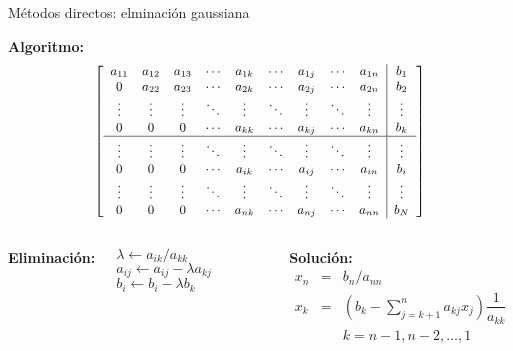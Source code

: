 \documentclass[9pt, aspectratio=169]{beamer}
\begin{document}
\begin{frame}{Métodos directos: elminación gaussiana}

\textbf{Algoritmo:}
\begin{equation*} {\small
\left[ 
 \begin{array}{ccccccccc|c}
 a_{11} & a_{12} & a_{13} & \cdots & a_{1k} & \cdots & a_{1j} & \cdots & a_{1n} & b_1 \\
 0      & a_{22} & a_{23} & \cdots & a_{2k} & \cdots & a_{2j} & \cdots & a_{2n} & b_2 \\
 \vdots & \vdots & \vdots & \ddots & \vdots & \ddots & \vdots & \ddots & \vdots & \vdots \\
 0      & 0      & 0      & \cdots & a_{kk} & \cdots & a_{kj} & \cdots & a_{kn} & b_k \\
 \hline
\vdots & \vdots & \vdots & \ddots & \vdots & \ddots & \vdots & \ddots & \vdots & \vdots \\
 0      & 0      & 0      & \cdots & a_{ik} & \cdots & a_{ij} & \cdots & a_{in} & b_i \\
\vdots & \vdots & \vdots & \ddots & \vdots & \ddots & \vdots & \ddots & \vdots & \vdots \\
 0      & 0      & 0      & \cdots & a_{nk} & \cdots & a_{nj} & \cdots & a_{nn} & b_N \\
 \end{array} \right] }
\end{equation*}
\begin{columns}[t]
\column{5cm}
\textbf{Eliminación:} {\small
\begin{algorithmic}[1]
    \State $\lambda \gets a_{ik}/a_{kk}$
      \State $a_{ij} \gets a_{ij} - \lambda a_{kj}$
    \EndFor
    \State $b_i \gets b_i - \lambda b_k$
 \EndFor	
\end{algorithmic} }
\column{6cm}
\textbf{Solución:} {\small
\begin{eqnarray*}
 x_n &=& b_n / a_{nn} \\
 x_k &=& \left( b_k- \sum_{j=k+1}^n a_{kj}x_j \right)  \dfrac{1}{a_{kk}} \\
 & &k = n-1, n-2, \ldots, 1
\end{eqnarray*} }
\end{columns}
\end{frame}
\end{document}

